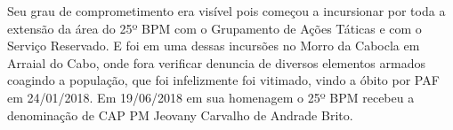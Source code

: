 \documentclass[10pt]{article}
\begin{document}
Seu grau de comprometimento era visível pois começou a incursionar por toda a extensão da área do 25º BPM com o Grupamento de Ações Táticas e com o Serviço Reservado.  E foi em uma dessas incursões no Morro da Cabocla em Arraial do Cabo, onde fora verificar denuncia de diversos elementos armados coagindo a população, que foi infelizmente foi vitimado, vindo a óbito por PAF em 24/01/2018. Em 19/06/2018 em sua homenagem o 25º BPM recebeu a denominação de CAP PM Jeovany Carvalho de Andrade Brito.



\iffalse
\begin{center}
  \textbf{REFERÊNCIAS}
\end{center}


\fi
\end{document}
